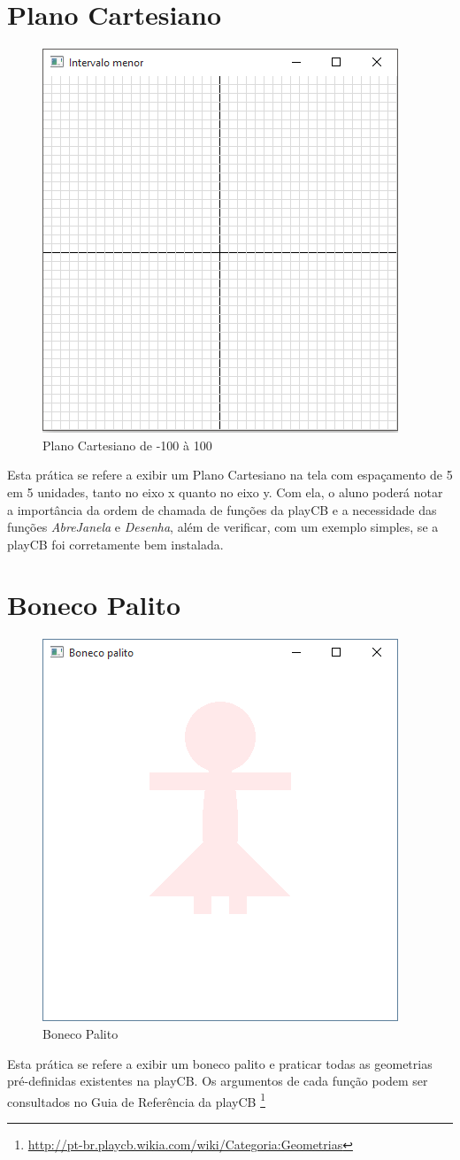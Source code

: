 \section{Plano Cartesiano}
\begin{figure}[ht]
  \centerline{\includegraphics[width=.5\textwidth]{img/cap1_ex1.png}}
  \caption{Plano Cartesiano de -100 à 100}
  \label{fig:cap01_ex1}
\end{figure}
Esta prática se refere a exibir um Plano Cartesiano na tela com espaçamento de 5 em 5 unidades, tanto no eixo x quanto no eixo y. Com ela, o aluno poderá notar a importância da ordem de chamada de funções da playCB e a necessidade das funções \emph{AbreJanela} e \emph{Desenha}, além de verificar, com um exemplo simples, se a playCB foi corretamente bem instalada.


\section{Boneco Palito}
\begin{figure}[ht]
  \centerline{\includegraphics[width=.5\textwidth]{img/cap1_ex3.png}}
  \caption{Boneco Palito}
  \label{fig:cap01_ex1}
\end{figure}
Esta prática se refere a exibir um boneco palito e praticar todas as geometrias pré-definidas existentes na playCB. Os argumentos de cada função podem ser consultados no Guia de Referência da playCB \footnote{\url{http://pt-br.playcb.wikia.com/wiki/Categoria:Geometrias}}


